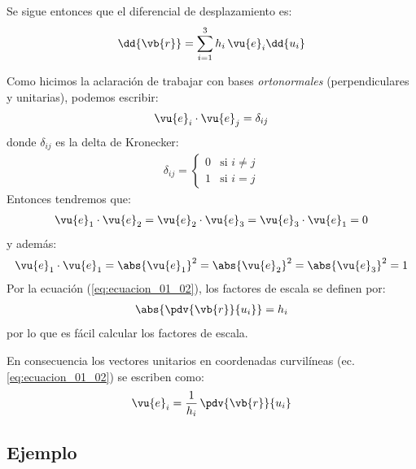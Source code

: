 \par
Se sigue entonces que el diferencial de desplazamiento es:
\begin{align*}
\dd{\vb{r}} = \sum_{i=1}^{3} h_{i} \, \vu{e}_{i} \dd{u_{i}}
\end{align*}
\par
Como hicimos la aclaración de trabajar con bases \emph{ortonormales} (perpendiculares y unitarias), podemos escribir:
\begin{align}
\vu{e}_{i} \cdot \vu{e}_{j} = \delta_{ij}
\label{eq:ecuacion_01_03}
\end{align}
donde $\delta_{ij}$ es la delta de Kronecker:
\begin{align*}
\delta_{ij} = 
\begin{cases}
0 & \mbox{si } i \neq j \\
1 & \mbox{si } i = j
\end{cases}
\end{align*}
Entonces tendremos que:
\begin{align*}
\vu{e}_{1} \cdot \vu{e}_{2} = \vu{e}_{2} \cdot \vu{e}_{3} = \vu{e}_{3} \cdot \vu{e}_{1} = 0  
\end{align*}
y además:
\begin{align*}
\vu{e}_{1} \cdot \vu{e}_{1} = \abs{\vu{e}_{1}}^{2} = \abs{\vu{e}_{2}}^{2} = \abs{\vu{e}_{3}}^{2} = 1
\end{align*}
Por la ecuación (\ref{eq:ecuacion_01_02}), los factores de escala se definen por:
\begin{align}
\abs{\pdv{\vb{r}}{u_{i}}} = h_{i}
\label{eq:ecuacion_01_04}
\end{align}
por lo que es fácil calcular los factores de escala.
\par
En consecuencia los vectores unitarios en coordenadas curvilíneas (ec. \ref{eq:ecuacion_01_02}) se escriben como:
\begin{align}
\vu{e}_{i} = \dfrac{1}{h_{i}} \, \pdv{\vb{r}}{u_{i}}
\label{eq:ecuacion_01_05}
\end{align}

\subsection*{Ejemplo}


